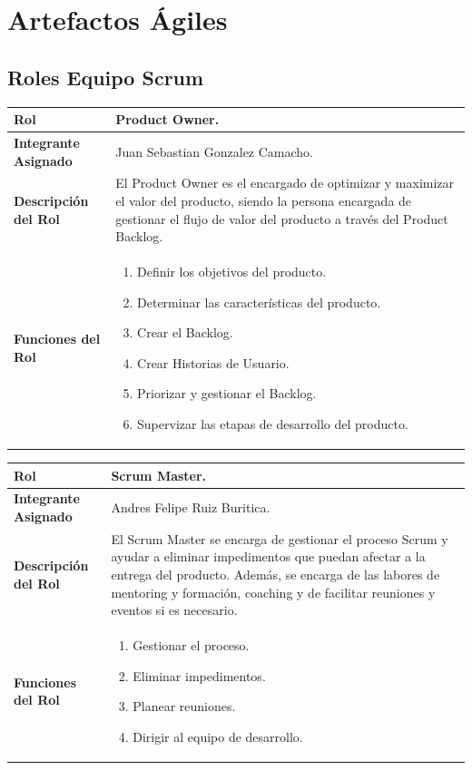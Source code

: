 \documentclass[12pt,a4paper]{article}
\begin{document}
\section{Artefactos Ágiles}
\subsection{Roles Equipo Scrum}
\begin{center}
\begin{tabular}{|m{5cm}|m{9cm}|}
\hline
\textbf{Rol} & Product Owner. \\
\hline
\textbf{Integrante Asignado} & Juan Sebastian Gonzalez Camacho. \\
\hline
\textbf{Descripción del Rol} & El Product Owner es el encargado de optimizar y maximizar el valor del producto, siendo la persona encargada de gestionar el flujo de valor del producto a través del Product Backlog. \\
\hline
\textbf{Funciones del Rol} & \begin{enumerate}[noitemsep]
								 \item Definir los objetivos del producto.
								 \item Determinar las características del producto.
								 \item Crear el Backlog.
								 \item Crear Historias de Usuario.
								 \item Priorizar y gestionar el Backlog.
								 \item Supervizar las etapas de desarrollo del producto.	
							\end{enumerate} \\
\hline
\end{tabular}
\vspace{5mm}

\begin{tabular}{|m{5cm}|m{9cm}|}
\hline
\textbf{Rol} & Scrum Master. \\
\hline
\textbf{Integrante Asignado} & Andres Felipe Ruiz Buritica. \\
\hline
\textbf{Descripción del Rol} & El Scrum Master se encarga de gestionar el proceso Scrum y ayudar a eliminar impedimentos que puedan afectar a la entrega del producto. Además, se encarga de las labores de mentoring y formación, coaching y de facilitar reuniones y eventos si es necesario. \\
\hline
\textbf{Funciones del Rol} & \begin{enumerate}[noitemsep]
								 \item Gestionar el proceso.
								 \item Eliminar impedimentos.
								 \item Planear reuniones.
								 \item Dirigir al equipo de desarrollo.	
							\end{enumerate} \\
\hline
\end{tabular}
\vspace{5mm}


\end{center}
\end{document}
